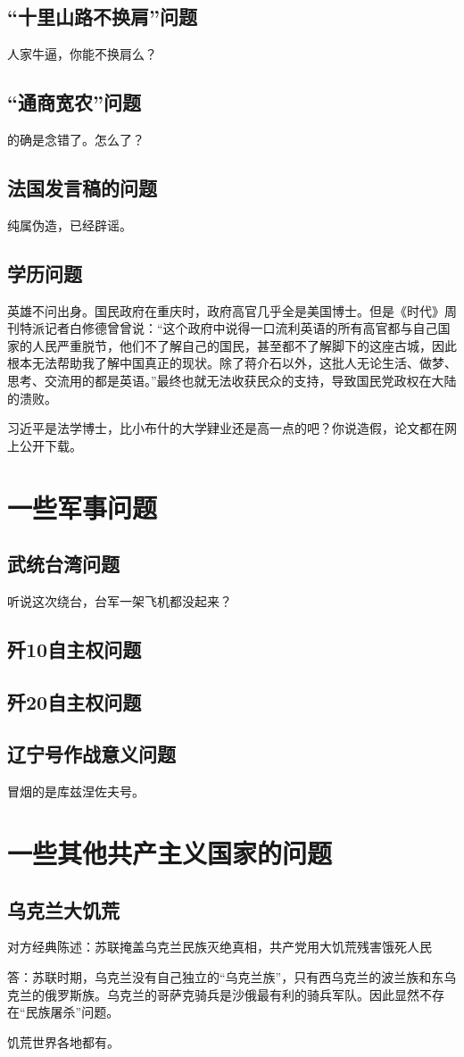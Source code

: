 \documentclass[UTF8,a4paper]{ctexart}
\begin{document}
\subsection{“十里山路不换肩”问题}
人家牛逼，你能不换肩么？
\subsection{“通商宽农”问题}
的确是念错了。怎么了？
\subsection{法国发言稿的问题}
纯属伪造，已经辟谣。
\subsection{学历问题}
英雄不问出身。国民政府在重庆时，政府高官几乎全是美国博士。但是《时代》周刊特派记者白修德曾曾说：“这个政府中说得一口流利英语的所有高官都与自己国家的人民严重脱节，他们不了解自己的国民，甚至都不了解脚下的这座古城，因此根本无法帮助我了解中国真正的现状。除了蒋介石以外，这批人无论生活、做梦、思考、交流用的都是英语。”最终也就无法收获民众的支持，导致国民党政权在大陆的溃败。

习近平是法学博士，比小布什的大学肄业还是高一点的吧？你说造假，论文都在网上公开下载。

\section{一些军事问题}
\subsection{武统台湾问题}
听说这次绕台，台军一架飞机都没起来？
\subsection{歼10自主权问题}
\subsection{歼20自主权问题}
\subsection{辽宁号作战意义问题}
冒烟的是库兹涅佐夫号。

\section{一些其他共产主义国家的问题}
\subsection{乌克兰大饥荒}
对方经典陈述：苏联掩盖乌克兰民族灭绝真相，共产党用大饥荒残害饿死人民

答：苏联时期，乌克兰没有自己独立的“乌克兰族”，只有西乌克兰的波兰族和东乌克兰的俄罗斯族。乌克兰的哥萨克骑兵是沙俄最有利的骑兵军队。因此显然不存在“民族屠杀”问题。

饥荒世界各地都有。
\end{document}
